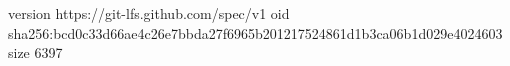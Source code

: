 version https://git-lfs.github.com/spec/v1
oid sha256:bcd0c33d66ae4c26e7bbda27f6965b201217524861d1b3ca06b1d029e4024603
size 6397

